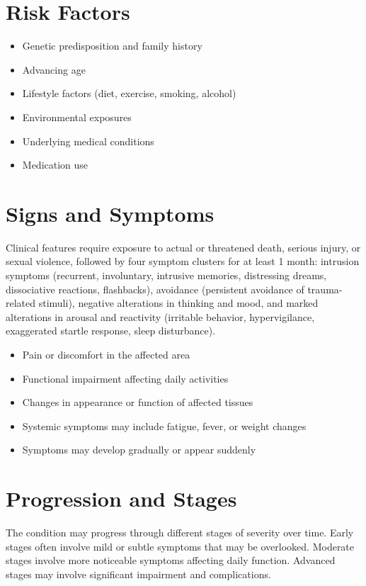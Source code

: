 \section{Risk Factors}
\begin{itemize}[noitemsep]
  \item Genetic predisposition and family history
  \item Advancing age
  \item Lifestyle factors (diet, exercise, smoking, alcohol)
  \item Environmental exposures
  \item Underlying medical conditions
  \item Medication use
\end{itemize}
\section{Signs and Symptoms}
Clinical features require exposure to actual or threatened death, serious injury, or sexual violence, followed by four symptom clusters for at least 1 month: intrusion symptoms (recurrent, involuntary, intrusive memories, distressing dreams, dissociative reactions, flashbacks), avoidance (persistent avoidance of trauma-related stimuli), negative alterations in thinking and mood, and marked alterations in arousal and reactivity (irritable behavior, hypervigilance, exaggerated startle response, sleep disturbance).

\begin{itemize}[noitemsep]
  \item Pain or discomfort in the affected area
  \item Functional impairment affecting daily activities
  \item Changes in appearance or function of affected tissues
  \item Systemic symptoms may include fatigue, fever, or weight changes
  \item Symptoms may develop gradually or appear suddenly
\end{itemize}
\section{Progression and Stages}
The condition may progress through different stages of severity over time. Early stages often involve mild or subtle symptoms that may be overlooked. Moderate stages involve more noticeable symptoms affecting daily function. Advanced stages may involve significant impairment and complications.
